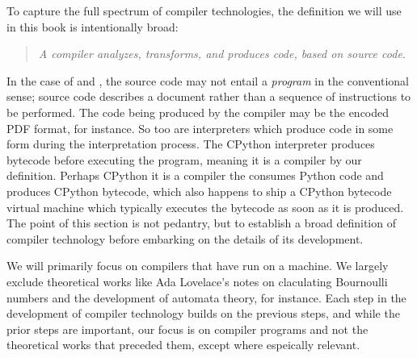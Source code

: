 \vspace{0.5em}

To capture the full spectrum of compiler technologies,
the definition we will use in this book is intentionally broad:
\begin{quotation}
\textit{
    A compiler analyzes, transforms, and produces code, based on source code.
}
\label{def:compiler}
\end{quotation}

In the case of \tex and \metafont, the source code
may not entail a \textit{program} in the conventional sense;
\tex source code describes a document rather than a sequence of
instructions to be performed.
The code being produced by the compiler may be the encoded PDF format, for instance.
So too are interpreters which produce code in some form during the interpretation process.
The CPython interpreter produces bytecode before executing the program,
meaning it is a compiler by our definition.
Perhaps CPython it is a compiler the consumes Python code and produces CPython bytecode,
which also happens to ship a CPython bytecode virtual machine which typically
executes the bytecode as soon as it is produced.
The point of this section is not pedantry, but to establish a broad definition of
compiler technology before embarking on the details of its development.

We will primarily focus on compilers that have run on a machine.
We largely exclude theoretical works like Ada Lovelace's notes on claculating Bournoulli numbers
and the development of automata theory, for instance.
Each step in the development of compiler technology builds on the previous steps,
and while the prior steps are important, our focus is on compiler programs and not the
theoretical works that preceded them, except where espeically relevant.
